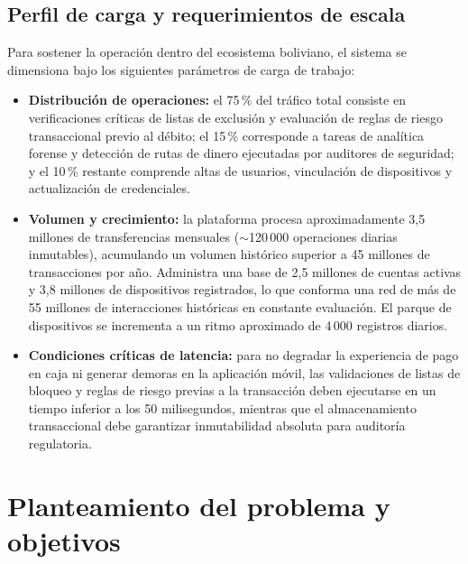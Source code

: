 \documentclass[11pt,a4paper]{article}
\begin{document}
	\subsection{Perfil de carga y requerimientos de escala}
	Para sostener la operación dentro del ecosistema boliviano, el sistema se dimensiona bajo los siguientes parámetros de carga de trabajo:
	\begin{itemize}[leftmargin=2em]
		\item \textbf{Distribución de operaciones:} el 75\,\% del tráfico total consiste en verificaciones críticas de listas de exclusión y evaluación de reglas de riesgo transaccional previo al débito; el 15\,\% corresponde a tareas de analítica forense y detección de rutas de dinero ejecutadas por auditores de seguridad; y el 10\,\% restante comprende altas de usuarios, vinculación de dispositivos y actualización de credenciales.
		\item \textbf{Volumen y crecimiento:} la plataforma procesa aproximadamente 3,5 millones de transferencias mensuales ($\sim$120\,000 operaciones diarias inmutables), acumulando un volumen histórico superior a 45 millones de transacciones por año. Administra una base de 2,5 millones de cuentas activas y 3,8 millones de dispositivos registrados, lo que conforma una red de más de 55 millones de interacciones históricas en constante evaluación. El parque de dispositivos se incrementa a un ritmo aproximado de 4\,000 registros diarios.
		\item \textbf{Condiciones críticas de latencia:} para no degradar la experiencia de pago en caja ni generar demoras en la aplicación móvil, las validaciones de listas de bloqueo y reglas de riesgo previas a la transacción deben ejecutarse en un tiempo inferior a los 50 milisegundos, mientras que el almacenamiento transaccional debe garantizar inmutabilidad absoluta para auditoría regulatoria.
	\end{itemize}
	
	\section{Planteamiento del problema y objetivos}
	
\end{document}
